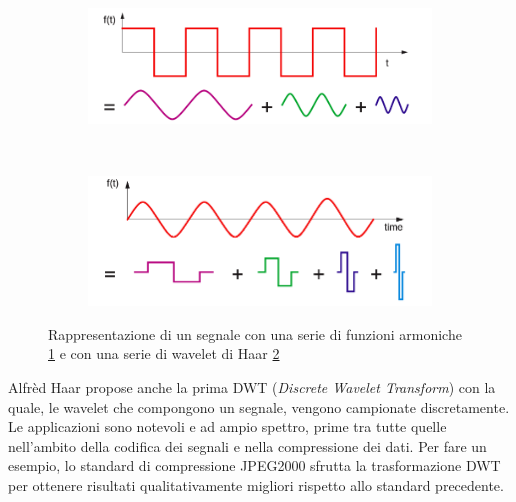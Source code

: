         \begin{figure}[h]
            \centering
            \begin{subfigure}[b]{0.48\textwidth}
            \includegraphics[width=\linewidth]{img/fourier_rapresentation.png}
                \caption{}
                \label{fig:fourier_rapresentation}
            \end{subfigure}
            ~ %
            \begin{subfigure}[b]{0.48\textwidth}
            \includegraphics[width=\linewidth]{img/haar_rapresentation.png}
                \caption{}
                \label{fig:wavelet_rapresentation}
            \end{subfigure}
            \caption{Rappresentazione di un segnale con una serie di funzioni armoniche \ref{fig:fourier_rapresentation} e con una serie di wavelet di Haar \ref{fig:wavelet_rapresentation}}
            \label{fig:signal_rapresentation}
        \end{figure}

        Alfrèd Haar propose anche la prima DWT (\emph{Discrete Wavelet Transform}) con la quale, le wavelet che compongono un segnale, vengono campionate discretamente.
        Le applicazioni sono notevoli e ad ampio spettro, prime tra tutte quelle nell'ambito della codifica dei segnali e nella compressione dei dati. Per fare un esempio, lo standard di compressione JPEG2000 sfrutta la trasformazione DWT \cite{Jpeg2000} per ottenere risultati qualitativamente migliori rispetto allo standard precedente.

